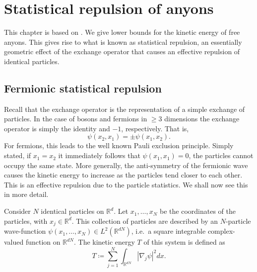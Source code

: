 
\chapter{Statistical repulsion of anyons}\label{chap:statistical repulsion}

This chapter is based on \cite{methmmp,lundholm-solovej,mancarella}. We give lower bounds for the kinetic energy of free anyons. This gives rise to what is known as statistical repulsion, an essentially geometric effect of the exchange operator that causes an effective repulsion of identical particles.


\section{Fermionic statistical repulsion}

Recall that the exchange operator is the representation of a simple exchange of particles. In the case of bosons and fermions in $\ge 3$ dimensions the exchange operator is simply the identity and $-1$, respectively. That is,
\begin{equation}
  \psi(x_2, x_1) = \pm \psi(x_1, x_2).
\end{equation}
For fermions, this leads to the well known Pauli exclusion principle. Simply stated, if $x_1 = x_2$ it immediately follows that $\psi(x_1, x_1) = 0$, the particles cannot occupy the same state. More generally, the anti-symmetry of the fermionic wave causes the kinetic energy to increase as the particles tend closer to each other. This is an effective repulsion due to the particle statistics. We shall now see this in more detail.

Consider $N$ identical particles on $\mathbb{R}^d$. Let $x_1, \ldots, x_N$ be the coordinates of the particles, with $x_j \in \mathbb{R}^d$. This collection of particles are described by an $N$-particle wave-function $\psi(x_1, \ldots, x_N) \in L^2(\mathbb{R}^{dN})$, i.e.\ a square integrable complex-valued function on $\mathbb{R}^{dN}$. The kinetic energy $T$ of this system is defined as
\begin{equation}
  T \coloneqq \sum_{j=1}^N \int_{\mathbb{R}^{dN}} |\nabla_j \psi|^2 dx.
\end{equation}

